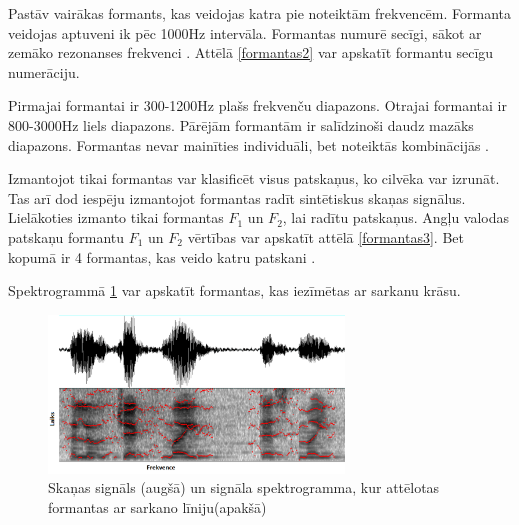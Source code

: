 \documentclass[12pt,paper=A4]{report}
\begin{document}
Pastāv vairākas formants, kas veidojas katra pie noteiktām frekvencēm. Formanta veidojas aptuveni ik pēc 1000Hz intervāla. Formantas numurē secīgi, sākot ar zemāko rezonanses frekvenci  \cite{http://person2.sol.lu.se/SidneyWood/praate/whatform.html}. Attēlā \ref{formantas2} var apskatīt formantu secīgu numerāciju.


Pirmajai formantai ir 300-1200Hz plašs frekvenču diapazons. Otrajai formantai ir 800-3000Hz liels diapazons. Pārējām formantām ir salīdzinoši daudz mazāks diapazons. Formantas nevar mainīties individuāli, bet noteiktās kombinācijās \cite{voice}. 

Izmantojot tikai formantas var klasificēt visus patskaņus, ko cilvēka var izrunāt. Tas arī dod iespēju izmantojot formantas radīt sintētiskus skaņas signālus. Lielākoties izmanto tikai formantas $F_1$ un $F_2$, lai radītu patskaņus. Angļu valodas patskaņu formantu $F_1$ un $F_2$ vērtības var apskatīt attēlā \ref{formantas3}. Bet kopumā ir 4 formantas, kas veido katru patskani \cite{https://makarandtapaswi.wordpress.com/2009/08/30/time-and-frequency-formants-and-harmonics/}.
 
Spektrogrammā \ref{formantas1} var apskatīt formantas, kas iezīmētas ar sarkanu krāsu.

\begin{figure}[H] \centering
\includegraphics[width=0.70\textwidth]{formants} 
\caption{Skaņas signāls (augšā) un signāla spektrogramma, kur attēlotas formantas ar sarkano līniju(apakšā) \cite{https://makarandtapaswi.wordpress.com/2009/08/30/time-and-frequency-formants-and-harmonics/}}  \label{formantas1} 
\end{figure}
\end{document}
